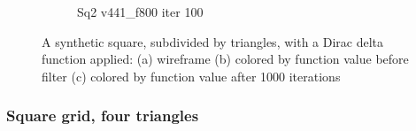\begin{figure}[ht]
{\begin{subfigure}[b]{0.48\linewidth}
		\caption{Sq2 v441\_f800 iter 100}\label{fig:sq2.f}
	\end{subfigure}}
	{\caption[Synthetic Square, 2 triangles, Dirac delta function]{A synthetic square, subdivided by triangles, with a Dirac delta function applied: (a) wireframe (b) colored by function value before filter (c) colored by function value after 1000 iterations
	}\label{fig:sq2}}
\end{figure}
\todoCitation{}

\subsubsection{Square grid, four triangles}


